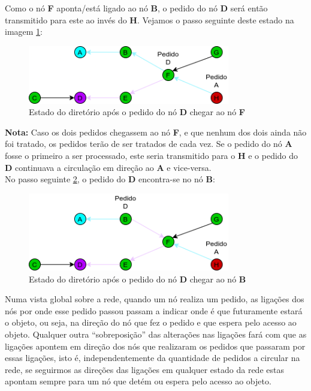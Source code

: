 Como o nó \textbf{F} aponta/está ligado ao nó \textbf{B}, o pedido do nó \textbf{D} será então transmitido para este ao invés do \textbf{H}.
Vejamos o passo seguinte deste estado na imagem \ref{motivacao:img:d_chega_f}:


\begin{figure}[!htb]
\centering
\includegraphics[width=250pt]{dois_pedidos_2.png}
\caption{Estado do diretório após o pedido do nó \textbf{D} chegar ao nó \textbf{F}}
\label{motivacao:img:d_chega_f}
\end{figure}

\textbf{Nota:} Caso os dois pedidos chegassem ao nó \textbf{F}, e que nenhum dos dois ainda não foi tratado, os pedidos terão de ser tratados de cada vez. Se o pedido do nó \textbf{A} fosse o primeiro a ser processado, este seria transmitido para o \textbf{H} e o pedido do \textbf{D} continuava a circulação em direção ao \textbf{A} e vice-versa. \\

No passo seguinte \ref{motivacao:img:d_chega_b}, o pedido do \textbf{D} encontra-se no nó \textbf{B}:


\begin{figure}[!htb]
\centering
\includegraphics[width=250pt]{dois_pedidos_3.png}
\caption{Estado do diretório após o pedido do nó \textbf{D} chegar ao nó \textbf{B}}
\label{motivacao:img:d_chega_b}
\end{figure}


Numa vista global sobre a rede, quando um nó realiza um pedido, as ligações dos nós por onde esse pedido passou passam a indicar onde é que futuramente estará o objeto, ou seja, na direção do nó que fez o pedido e que espera pelo acesso ao objeto.
Qualquer outra ``sobreposição'' das alterações nas ligações fará com que as ligações apontem em direção dos nós que realizaram os pedidos que passaram por essas ligações, isto é, independentemente da quantidade de pedidos a circular na rede, se seguirmos as direções das ligações em qualquer estado da rede estas apontam sempre para um nó que detém ou espera pelo acesso ao objeto.


